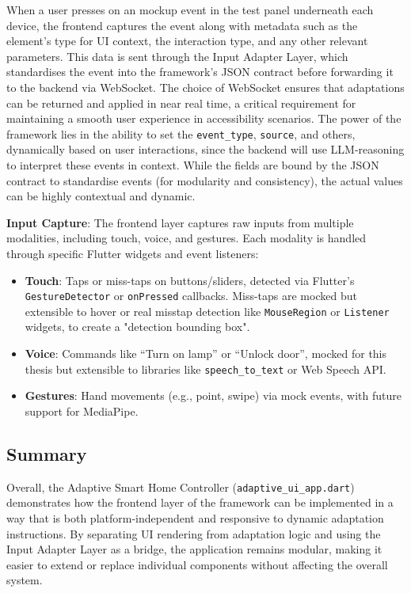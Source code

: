 When a user presses on an mockup event in the test panel underneath each device, the frontend captures the event along with metadata such as the element’s type for UI context, the interaction type, and any other relevant parameters. This data is sent through the Input Adapter Layer, which standardises the event into the framework’s JSON contract before forwarding it to the backend via WebSocket. The choice of WebSocket ensures that adaptations can be returned and applied in near real time, a critical requirement for maintaining a smooth user experience in accessibility scenarios. The power of the framework lies in the ability to set the \texttt{event\_type}, \texttt{source}, and others, dynamically based on user interactions, since the backend will use LLM-reasoning to interpret these events in context. While the fields are bound by the JSON contract to standardise events (for modularity and consistency), the actual values can be highly contextual and dynamic.

\textbf{Input Capture}: The frontend layer captures raw inputs from multiple modalities, including touch, voice, and gestures. Each modality is handled through specific Flutter widgets and event listeners:
\begin{itemize}
    \item \textbf{Touch}: Taps or miss-taps on buttons/sliders, detected via Flutter’s \verb|GestureDetector| or \verb|onPressed| callbacks. Miss-taps are mocked but extensible to hover or real misstap detection like \verb|MouseRegion| or \verb|Listener| widgets, to create a "detection bounding box".
    \item \textbf{Voice}: Commands like “Turn on lamp” or “Unlock door”, mocked for this thesis but extensible to libraries like \verb|speech_to_text| or Web Speech API.
    \item \textbf{Gestures}: Hand movements (e.g., point, swipe) via mock events, with future support for MediaPipe.
\end{itemize}

\subsection{Summary}
Overall, the Adaptive Smart Home Controller (\texttt{adaptive\_ui\_app.dart}) demonstrates how the frontend layer of the framework can be implemented in a way that is both platform-independent and responsive to dynamic adaptation instructions. By separating UI rendering from adaptation logic and using the Input Adapter Layer as a bridge, the application remains modular, making it easier to extend or replace individual components without affecting the overall system.

